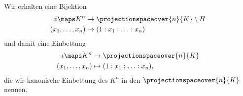 Wir erhalten eine Bijektion
\begin{equation*}
  \begin{split}
    \phi\maps K^n&\to \projectionspaceover{n}{K}\setminus H\\
    (x_1,\dotsc,x_n)&\mapsto (1:x_1:\dotsc:x_n)
  \end{split}
\end{equation*}
und damit eine Einbettung
\begin{equation*}
  \begin{split}
    \iota\maps K^n&\to \projectionspaceover{n}{K}\\
    (x_1,\dotsc,x_n)&\mapsto (1:x_1:\dotsc:x_n),
  \end{split}
\end{equation*}
die wir kanonische Einbettung des \( K^n \) in den \( \projectionspaceover{n}{K} \) nennen.

